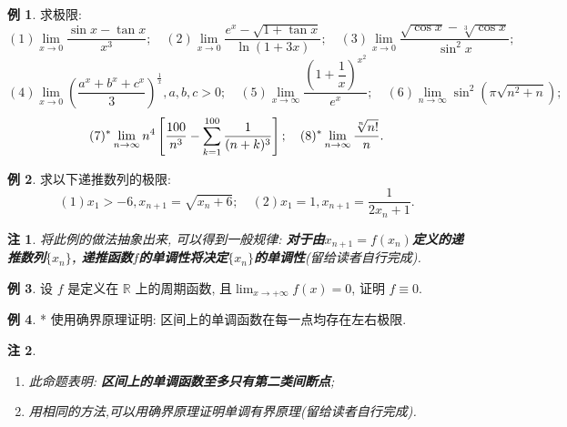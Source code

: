 \documentclass{ctexart}
\newtheorem*{rmk}{注}
\theoremstyle{definition}
\newtheorem{ex}{例}
\DeclareMathOperator{\anlim}{\lim\limits_{\mathnormal{n}\to\infty}}
\renewcommand{\frac}{\dfrac}
\begin{document}
\begin{ex}
求极限: 
\[(1) \lim_{x\to0}\frac{\sin x-\tan x}{x^3};\quad
(2) \lim_{x\to0}\frac{e^x-\sqrt{1+\tan x}}{\ln(1+3x)};\quad
(3) \lim_{x\to0}\frac{\sqrt{\cos x}-\sqrt[3]{\cos x}}{\sin^2x};
\]\[(4) \lim_{x\to0}\left(\frac{a^x+b^x+c^x}{3}\right)^{\tfrac1x}, a,b,c>0;\quad
(5) \lim_{x\to\infty}\frac{(1+\frac{1}{x})^{x^2}}{e^x};\quad
(6) \lim_{n\to\infty}\sin^2\!\left(\pi\sqrt{n^2+n}\right); \]\[
(7)^* \anlim n^4\left[\frac{100}{n^3}-\sum_{k=1}^{100} \frac{1}{(n+k)^3}\right];\quad 
(8)^* \anlim \frac{\sqrt[n]{n!}}{n}.\]
\end{ex}


\begin{ex}
求以下递推数列的极限: 
\[
(1)x_1>-6, x_{n+1}=\sqrt{x_n+6};\quad (2) x_1=1, x_{n+1}=\frac{1}{2x_n+1}.
\]
\end{ex}

\begin{rmk}
将此例的做法抽象出来, 可以得到一般规律: \textbf{对于由$x_{n+1}=f(x_n)$定义的递推数列$\{x_n\}$, 递推函数$f$的单调性将决定$\{x_n\}$的单调性}(留给读者自行完成).
\end{rmk}


\begin{ex}
设 $f$ 是定义在 $\mathbb{R}$ 上的周期函数, 且$\lim_{x\to+\infty}f(x)=0$, 证明 $f\equiv0$.

\end{ex}



\begin{ex}*
使用确界原理证明: 区间上的单调函数在每一点均存在左右极限.
\end{ex}

\begin{rmk}\,
\begin{enumerate}
\item 此命题表明: \textbf{区间上的单调函数至多只有第二类间断点};
\item 用相同的方法,可以用确界原理证明单调有界原理(留给读者自行完成).
\end{enumerate}
\end{rmk}
\end{document}
